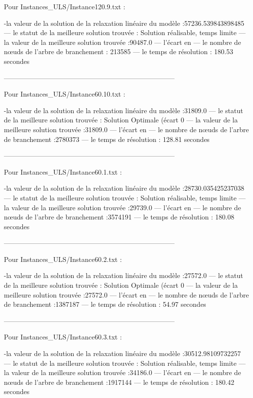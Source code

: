 Pour Instances_ULS/Instance120.9.txt :


-la valeur de la solution de la relaxation linéaire du modèle :57236.539843898485
— le statut de la meilleure solution trouvée : Solution réalisable, temps limite
— la valeur de la meilleure solution trouvée :90487.0
— l’écart en %
— le nombre de nœuds de l’arbre de branchement : 213585
— le temps de résolution : 180.53 secondes

---------------------------------------------------------------------------

Pour Instances_ULS/Instance60.10.txt :


-la valeur de la solution de la relaxation linéaire du modèle :31809.0
— le statut de la meilleure solution trouvée : Solution Optimale (écart 0%
— la valeur de la meilleure solution trouvée :31809.0
— l’écart en %
— le nombre de nœuds de l’arbre de branchement :2780373
— le temps de résolution : 128.81 secondes

---------------------------------------------------------------------------

Pour Instances_ULS/Instance60.1.txt :


-la valeur de la solution de la relaxation linéaire du modèle :28730.035425237038
— le statut de la meilleure solution trouvée : Solution réalisable, temps limite 
— la valeur de la meilleure solution trouvée :29739.0
— l’écart en %
— le nombre de nœuds de l’arbre de branchement :3574191
— le temps de résolution : 180.08 secondes


---------------------------------------------------------------------------

Pour Instances_ULS/Instance60.2.txt :


-la valeur de la solution de la relaxation linéaire du modèle :27572.0
— le statut de la meilleure solution trouvée : Solution Optimale (écart 0%
— la valeur de la meilleure solution trouvée :27572.0
— l’écart en %
— le nombre de nœuds de l’arbre de branchement :1387187
— le temps de résolution : 54.97 secondes


---------------------------------------------------------------------------

Pour Instances_ULS/Instance60.3.txt :


-la valeur de la solution de la relaxation linéaire du modèle :30512.98109732257
— le statut de la meilleure solution trouvée : Solution réalisable, temps limite 
— la valeur de la meilleure solution trouvée :34186.0
— l’écart en %
— le nombre de nœuds de l’arbre de branchement :1917144
— le temps de résolution : 180.42 secondes


